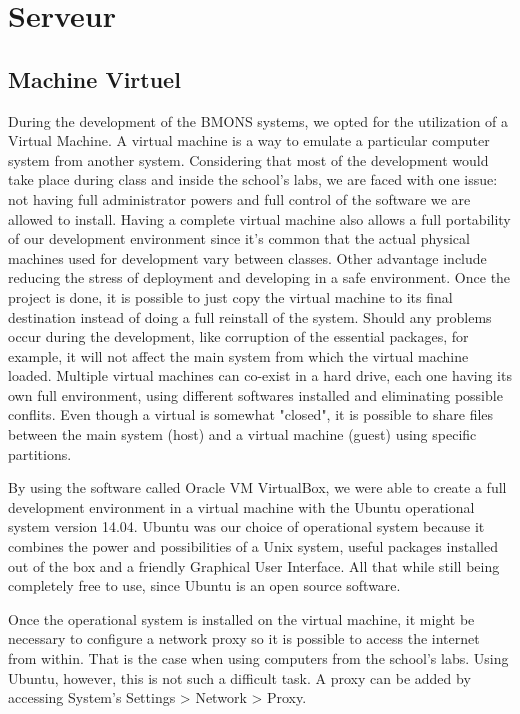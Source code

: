 \chapter{Serveur}
\section{Machine Virtuel}

During the development of the BMONS systems, we opted for the utilization of a Virtual Machine. A virtual machine is a way to emulate a particular computer system from another system. Considering that most of the development would take place during class and inside the school's labs, we are faced with one issue: not having full administrator powers and full control of the software we are allowed to install. Having a complete virtual machine also allows a full portability of our development environment since it's common that the actual physical machines used for development vary between classes. Other advantage include reducing the stress of deployment and developing in a safe environment. Once the project is done, it is possible to just copy the virtual machine to its final destination instead of doing a full reinstall of the system. Should any problems occur during the development, like corruption of the essential packages, for example, it will not affect the main system from which the virtual machine loaded. Multiple virtual machines can co-exist in a hard drive, each one having its own full environment, using different softwares installed and eliminating possible conflits. Even though a virtual is somewhat "closed", it is possible to share files between the main system (host) and a virtual machine (guest) using specific partitions. 

By using the software called Oracle VM VirtualBox, we were able to create a full development environment in a virtual machine with the Ubuntu operational system version 14.04. Ubuntu was our choice of operational system because it combines the power and possibilities of a Unix system, useful packages installed out of the box and a friendly Graphical User Interface. All that while still being completely free to use, since Ubuntu is an open source software. 

Once the operational system is installed on the virtual machine, it might be necessary to configure a network proxy so it is possible to access the internet from within. That is the case when using computers from the school's labs. Using Ubuntu, however, this is not such a difficult task. A proxy can be added by accessing System's Settings > Network > Proxy. 

